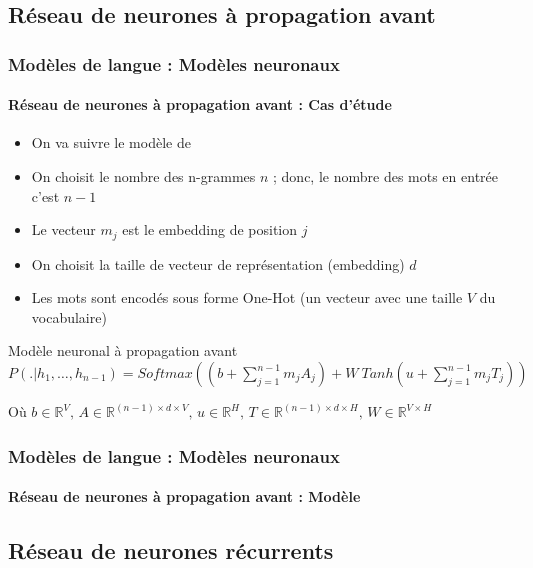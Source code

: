 \documentclass[xcolor=table]{beamer}
\begin{document}
\subsection{Réseau de neurones à propagation avant}

\begin{frame}
\frametitle{Modèles de langue : Modèles neuronaux}
\framesubtitle{Réseau de neurones à propagation avant : Cas d'étude}

\begin{itemize}
	\item On va suivre le modèle de \cite{2003-bengio-al}
	\item On choisit le nombre des n-grammes $n$ ; donc, le nombre des mots en entrée c'est $n-1$
	\item Le vecteur $m_j$ est le embedding de position $j$
	\item On choisit la taille de vecteur de représentation (embedding) $d$
	\item Les mots sont encodés sous forme One-Hot (un vecteur avec une taille $V$ du vocabulaire)
\end{itemize}

\begin{block}{Modèle neuronal à propagation avant}
	$
	P(.|h_1,\ldots, h_{n-1}) = 
	Softmax \left(
	(b + \sum\limits_{j=1}^{n-1} m_j A_j) 
	+ 
	W\ Tanh(u + \sum\limits_{j=1}^{n-1} m_j T_j)
	\right)
	$
	
	Où $b \in \mathbb{R}^{V},\, A \in \mathbb{R}^{(n-1) \times d \times V},\, u \in \mathbb{R}^{H},\, T \in \mathbb{R}^{(n-1) \times d \times H},\, W \in \mathbb{R}^{V \times H}$
\end{block}

\end{frame}

\begin{frame}
\frametitle{Modèles de langue : Modèles neuronaux}
\framesubtitle{Réseau de neurones à propagation avant : Modèle}


\end{frame}

\subsection{Réseau de neurones récurrents}
\end{document}

